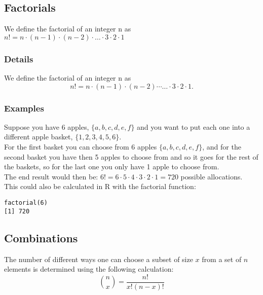 \documentclass[12pt,a4paper]{article}
\theoremstyle{regla}
\theoremstyle{remark}
\theoremstyle{definition}
\theoremstyle{nonumberbreak}
\begin{document}
\subsection{Factorials}
\begin{fbox}
\begin{minipage}{0.97\textwidth}
We define the factorial of an integer n as \\
$n!= n\cdot(n-1) \cdot(n-2)\cdot \ldots \cdot 3 \cdot 2 \cdot 1$

\end{minipage}
\end{fbox}
\subsubsection{Details}
\begin{defn}
We define the factorial of an integer n as
$$
n!= n\cdot(n-1) \cdot(n-2)\cdots \ldots \cdot 3 \cdot 2 \cdot 1 .
$$
\end{defn}
\subsubsection{Examples}
\begin{xmpl}

Suppose you have 6 apples, $\{a, b, c, d, e, f\}$ and you 
want to put each one into a different apple basket, $\{1,2,3,4,5,6\}$.\\

For the first basket you can choose from 6 apples $\{a, b, c, d, e,
f\}$, and for the second basket you have then 5 apples to choose from
and so it goes for the rest of the baskets, so for the last one you
only have 1 apple to choose from.\\

The end result would then be: 
$6! = 6 \cdot 5 \cdot 4 \cdot 3 \cdot 2 \cdot 1 = 720$ possible allocations.\\

This could also be calculated in R with the factorial function:
\begin{lstlisting}
factorial(6)
[1] 720
\end{lstlisting}
\end{xmpl}


\subsection{Combinations}
\begin{fbox}
\begin{minipage}{0.97\textwidth}
The number of different ways one can choose a subset of size $x$ from a set of $n$ elements is determined using the following calculation:
$$
{n \choose x}= \frac{{n!}}{{x!\left( {n - x} \right)!}}
$$

\end{minipage}
\end{fbox}
\end{document}
